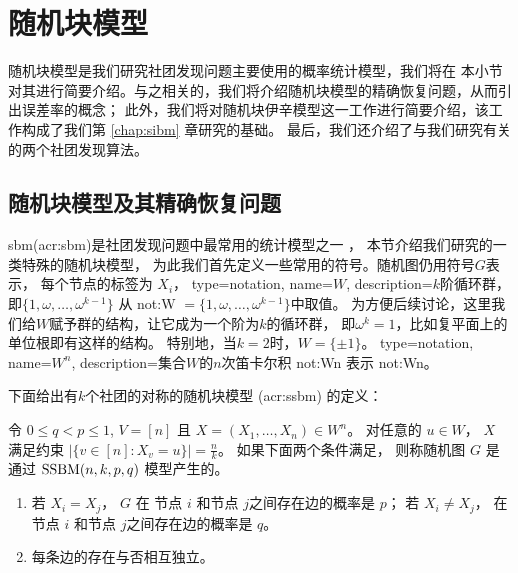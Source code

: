 \section{随机块模型}\label{sec:sbm}
随机块模型是我们研究社团发现问题主要使用的概率统计模型，我们将在
本小节对其进行简要介绍。与之相关的，我们将介绍随机块模型的精确恢复问题，从而引出误差率的概念；
此外，我们将对随机块伊辛模型这一工作进行简要介绍，该工作构成了我们第 \ref{chap:sibm} 章研究的基础。
最后，我们还介绍了与我们研究有关的两个社团发现算法。

\subsection{随机块模型及其精确恢复问题}\label{sec:exact_recovery}
\gls{sbm}(\gls{acr:sbm})是社团发现问题中最常用的统计模型之一
\cite{holland1983stochastic, abbe2017community}，
本节介绍我们研究的一类特殊的随机块模型，
%
为此我们首先定义一些常用的符号。随机图仍用符号$G$表示，
每个节点的标签为 $X_i$，
{
  type=notation,
  name={\ensuremath{W}},
  description={$k$阶循环群，即$\{1, \omega, \dots, \omega^{k-1}\}$}
}
从 \gls{not:W} $= \{1, \omega, \dots, \omega^{k-1}\}$中取值。
为方便后续讨论，这里我们给$W$赋予群的结构，让它成为一个阶为$k$的循环群，
即$\omega^k=1$，比如复平面上的单位根即有这样的结构。
特别地，当$k=2$时，$W=\{\pm 1\}$。
{
  type=notation,
  name={\ensuremath{W^n}},
  description={集合$W$的$n$次笛卡尔积}
}
\gls{not:Wn} 表示 \glsdesc{not:Wn}。 

下面给出有$k$个社团的对称的随机块模型
(\gls{acr:ssbm})
的定义： 
	\begin{definition}\label{def:SSBM}
	令 $0\leq q<p\leq 1$, $V=[n]$ 且
  $X=(X_1,\dots,X_n)\in W^n$。 对任意的 $u\in W$，
  $X$ 满足约束
  $|\{v \in [n] : X_v = u\}| = \frac{n}{k}$。
	如果下面两个条件满足，
  则称随机图 $G$ 是通过 $\operatorname{SSBM}(n,k,p,q)$ 模型产生的。 
	\begin{enumerate}
	\item 若 $X_i=X_j$， $G$ 在 节点 $i$ 和节点 $j$之间存在边的概率是 $p$； 
 若 $X_i \neq X_j$，  在 节点 $i$ 和节点 $j$之间存在边的概率是 $q$。
	\item 每条边的存在与否相互独立。
	\end{enumerate}
\end{definition}

